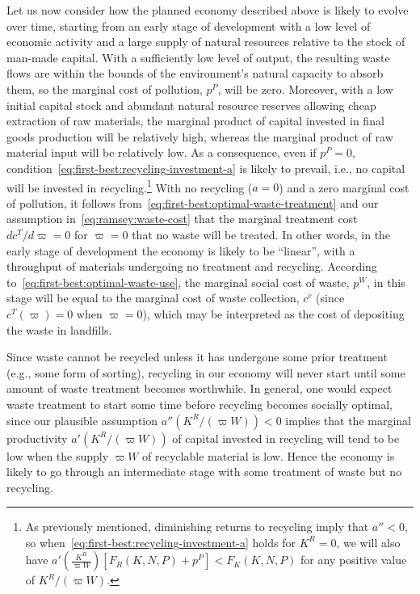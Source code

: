 Let us now consider how the planned economy described above is likely to evolve over time, starting from an early stage of development with a low level of economic activity and a large supply of natural resources relative to the stock of man-made capital. With a sufficiently low level of output, the resulting waste flows are within the bounds of the environment's natural capacity to absorb them, so the marginal cost of pollution, $p^P$, will be zero. Moreover, with a low initial capital stock and abundant natural resource reserves allowing cheap extraction of raw materials, the marginal product of capital invested in final goods production will be relatively high, whereas the marginal product of raw material input will be relatively low. As a consequence, even if $p^P=0$, condition~\eqref{eq:first-best:recycling-investment-a} is likely to prevail, i.e., no capital will be invested in recycling.\footnote{As previously mentioned, diminishing returns to recycling imply that $a''<0$, so when~\eqref{eq:first-best:recycling-investment-a} holds for $K^R=0$, we will also have $a'\left(\frac{K^R}{\varpi W}\right)\left[F_R(K,N,P) + p^P\right] < F_K(K,N,P)$ for any positive value of $K^R/(\varpi W)$.} With no recycling ($a=0$) and a zero marginal cost of pollution, it follows from~\eqref{eq:first-best:optimal-waste-treatment} and our assumption in~\eqref{eq:ramsey:waste-cost} that the marginal treatment cost $dc^T/d\varpi = 0$ for $\varpi=0$ that no waste will be treated. In other words, in the early stage of development the economy is likely to be ``linear'', with a throughput of materials undergoing no treatment and recycling. According to~\eqref{eq:first-best:optimal-waste-use}, the marginal social cost of waste, $p^W$, in this stage will be equal to the marginal cost of waste collection, $c^c$ (since $c^T(\varpi)=0$ when $\varpi=0$), which may be interpreted as the cost of depositing the waste in landfills.

Since waste cannot be recycled unless it has undergone some prior treatment (e.g., some form of sorting), recycling in our economy will never start until some amount of waste treatment becomes worthwhile. In general, one would expect waste treatment to start some time before recycling becomes socially optimal, since our plausible assumption $a''\left(K^R/(\varpi W)\right) < 0$ implies that the marginal productivity $a'\left(K^R/(\varpi W)\right)$ of capital invested in recycling will tend to be low when the supply $\varpi W$ of recyclable material is low. Hence the economy is likely to go through an intermediate stage with some treatment of waste but no recycling.

